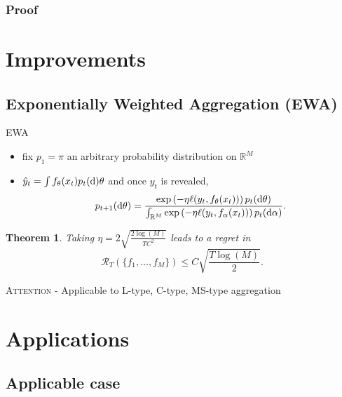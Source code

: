 \documentclass{beamer}
\newtheorem{Th}{Theorem}
\begin{document}
			\subsubsection*{Proof}
			
	\section{Improvements}
		\subsection{Exponentially Weighted Aggregation (EWA)}
			\begin{frame}{EWA}

				  
				\begin{itemize}
				\item fix $p_1 = \pi$ an arbitrary probability distribution on $\mathbb{R}^M$ 
				\item $\hat{y}_t=\int f_\theta (x_t) p_t({\rm d})\theta$ and once $y_t$ is revealed,
$$ p_{t+1}({\rm d}\theta) = \frac{
\exp\left(-\eta \ell(y_t,f_\theta (x_t)) \right) p_{t}({\rm d}\theta)
}{
\int_{\mathbb{R}^M} \exp\left(-\eta \ell(y_t,f_\alpha (x_t)) \right) p_{t}({\rm d}\alpha)
}. $$
				\end{itemize}
				\begin{Th}
					Taking $\eta=2\sqrt{\frac{2\log(M)}{T C^2}}$ leads to a regret in
$$
\mathcal{R}_T(\{f_1,\dots,f_M\}) \leq C \sqrt{\frac{T \log(M)}{2}}.
$$
				\end{Th}
				\textsc{Attention} - Applicable to L-type, C-type, MS-type aggregation
			\end{frame}


\section{Applications}
		\subsection{Applicable case}
\end{document}
